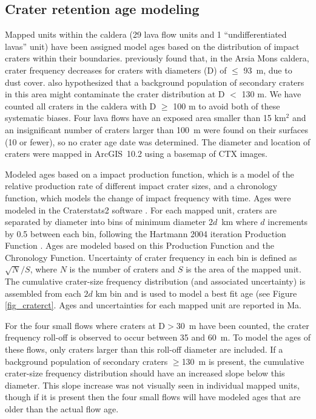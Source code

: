 \documentclass[12pt,letter]{article}
\begin{document}
\subsection{Crater retention age modeling}

Mapped units within the caldera (29 lava flow units and 1 ``undifferentiated lavas'' unit) have been assigned model ages based on the distribution of impact craters within their boundaries. \citet{robbins2011volcanic} previously found that, in the Arsia Mons caldera, crater frequency decreases for craters with diameters (D) of $\le$ 93~m, due to dust cover. \citet{robbins2011volcanic} also hypothesized that a background population of secondary craters in this area might contaminate the crater distribution at D $<$ 130 m. We have counted all craters in the caldera with D $\ge$ 100 m to avoid both of these systematic biases. Four lava flows have an exposed area smaller than 15 km$^2$ and an insignificant number of craters larger than 100~m were found on their surfaces (10 or fewer), so no crater age date was determined. The diameter and location of craters were mapped in ArcGIS~10.2 using a basemap of CTX images.

Modeled ages based on a impact production function, which is a model of the relative production rate of different impact crater sizes, and a chronology function, which models the change of impact frequency with time. Ages were modeled in the Craterstats2 software \citep{michael2013planetary}. For each mapped unit, craters are separated by diameter into bins of minimum diameter $2d$~km where $d$ increments by 0.5 between each bin, following the Hartmann 2004 iteration Production Function \citep{hartmann2005martian}. Ages are modeled based on this Production Function and the \citet{michael2013planetary} Chronology Function. Uncertainty of crater frequency in each bin is defined as $\sqrt{N}/S$, where $N$ is the number of craters and $S$ is the area of the mapped unit. The cumulative crater-size frequency distribution (and associated uncertainty) is assembled from each $2d$ km bin and is used to model a best fit age (see Figure \ref{fig_craterct}. Ages and uncertainties for each mapped unit are reported in Ma.

For the four small flows where craters at D$>$30~m have been counted, the crater frequency roll-off is observed to occur between 35 and 60~m. To model the ages of these flows, only craters larger than this roll-off diameter are included. If a background population of secondary craters $\ge$130~m is present, the  cumulative crater-size frequency distribution should have an increased slope below this diameter. This slope increase was not visually seen in individual mapped units, though if it is present then the four small flows will have modeled ages that are older than the actual flow age. 
\end{document}
